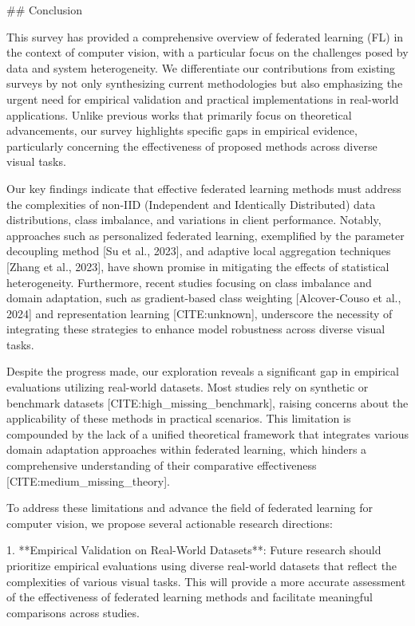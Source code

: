 \documentclass[journal]{IEEEtran}
\begin{document}
\#\# Conclusion

This survey has provided a comprehensive overview of federated learning (FL) in the context of computer vision, with a particular focus on the challenges posed by data and system heterogeneity. We differentiate our contributions from existing surveys by not only synthesizing current methodologies but also emphasizing the urgent need for empirical validation and practical implementations in real-world applications. Unlike previous works that primarily focus on theoretical advancements, our survey highlights specific gaps in empirical evidence, particularly concerning the effectiveness of proposed methods across diverse visual tasks.

Our key findings indicate that effective federated learning methods must address the complexities of non-IID (Independent and Identically Distributed) data distributions, class imbalance, and variations in client performance. Notably, approaches such as personalized federated learning, exemplified by the parameter decoupling method [Su et al., 2023], and adaptive local aggregation techniques [Zhang et al., 2023], have shown promise in mitigating the effects of statistical heterogeneity. Furthermore, recent studies focusing on class imbalance and domain adaptation, such as gradient-based class weighting [Alcover-Couso et al., 2024] and representation learning [CITE:unknown], underscore the necessity of integrating these strategies to enhance model robustness across diverse visual tasks.

Despite the progress made, our exploration reveals a significant gap in empirical evaluations utilizing real-world datasets. Most studies rely on synthetic or benchmark datasets [CITE:high_missing_benchmark], raising concerns about the applicability of these methods in practical scenarios. This limitation is compounded by the lack of a unified theoretical framework that integrates various domain adaptation approaches within federated learning, which hinders a comprehensive understanding of their comparative effectiveness [CITE:medium_missing_theory].

To address these limitations and advance the field of federated learning for computer vision, we propose several actionable research directions:

1. **Empirical Validation on Real-World Datasets**: Future research should prioritize empirical evaluations using diverse real-world datasets that reflect the complexities of various visual tasks. This will provide a more accurate assessment of the effectiveness of federated learning methods and facilitate meaningful comparisons across studies.
\end{document}
